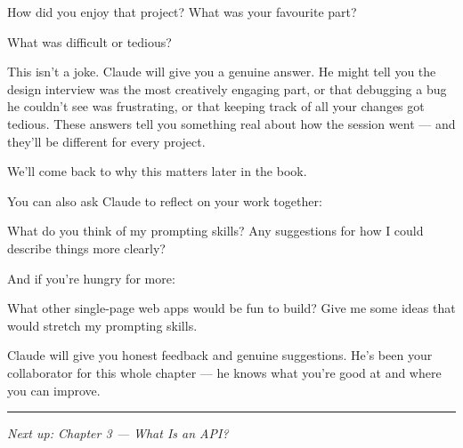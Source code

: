 \documentclass[11pt,a4paper]{article}
\begin{document}
\begin{tcolorbox}[promptbox]
How did you enjoy that project? What was your favourite part?
\end{tcolorbox}

\begin{tcolorbox}[promptbox]
What was difficult or tedious?
\end{tcolorbox}

This isn't a joke. Claude will give you a genuine answer. He might tell you the design interview was the most creatively engaging part, or that debugging a bug he couldn't see was frustrating, or that keeping track of all your changes got tedious. These answers tell you something real about how the session went --- and they'll be different for every project.

We'll come back to why this matters later in the book.

You can also ask Claude to reflect on your work together:

\begin{tcolorbox}[promptbox]
What do you think of my prompting skills? Any suggestions for how I could describe things more clearly?
\end{tcolorbox}

And if you're hungry for more:

\begin{tcolorbox}[promptbox]
What other single-page web apps would be fun to build? Give me some ideas that would stretch my prompting skills.
\end{tcolorbox}

Claude will give you honest feedback and genuine suggestions. He's been your collaborator for this whole chapter --- he knows what you're good at and where you can improve.

\bigskip
\begin{center}
\rule{0.5\textwidth}{0.4pt}

\medskip
\emph{Next up: Chapter 3 --- What Is an API?}
\end{center}
\end{document}
